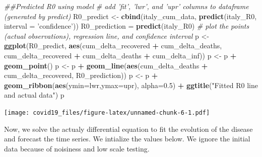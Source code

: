 \documentclass[]{article}
\newenvironment{Shaded}{\begin{snugshade}}{\end{snugshade}}
\newcommand{\CommentTok}[1]{\textcolor[rgb]{0.56,0.35,0.01}{\textit{#1}}}
\newcommand{\DataTypeTok}[1]{\textcolor[rgb]{0.13,0.29,0.53}{#1}}
\newcommand{\FloatTok}[1]{\textcolor[rgb]{0.00,0.00,0.81}{#1}}
\newcommand{\KeywordTok}[1]{\textcolor[rgb]{0.13,0.29,0.53}{\textbf{#1}}}
\newcommand{\NormalTok}[1]{#1}
\newcommand{\OperatorTok}[1]{\textcolor[rgb]{0.81,0.36,0.00}{\textbf{#1}}}
\newcommand{\StringTok}[1]{\textcolor[rgb]{0.31,0.60,0.02}{#1}}
\begin{document}
\begin{Shaded}
\begin{Highlighting}[]
\CommentTok{##Predicted R0 using model}
\CommentTok{# add 'fit', 'lwr', and 'upr' columns to dataframe (generated by predict)}
\NormalTok{R0_predict <-}\StringTok{ }\KeywordTok{cbind}\NormalTok{(italy_cum_data, }\KeywordTok{predict}\NormalTok{(italy_R0, }\DataTypeTok{interval =} \StringTok{'confidence'}\NormalTok{))}
\NormalTok{R0_prediction =}\StringTok{ }\KeywordTok{predict}\NormalTok{(italy_R0)}
\CommentTok{# plot the points (actual observations), regression line, and confidence interval}
\NormalTok{p <-}\StringTok{ }\KeywordTok{ggplot}\NormalTok{(R0_predict, }\KeywordTok{aes}\NormalTok{(cum_delta_recovered }\OperatorTok{+}\StringTok{ }\NormalTok{cum_delta_deaths, cum_delta_recovered }\OperatorTok{+}\StringTok{ }\NormalTok{cum_delta_deaths }\OperatorTok{+}\StringTok{ }\NormalTok{cum_delta_inf))}
\NormalTok{p <-}\StringTok{ }\NormalTok{p }\OperatorTok{+}\StringTok{ }\KeywordTok{geom_point}\NormalTok{()}
\NormalTok{p <-}\StringTok{ }\NormalTok{p }\OperatorTok{+}\StringTok{ }\KeywordTok{geom_line}\NormalTok{(}\KeywordTok{aes}\NormalTok{(cum_delta_deaths }\OperatorTok{+}\StringTok{ }\NormalTok{cum_delta_recovered, R0_prediction))}
\NormalTok{p <-}\StringTok{ }\NormalTok{p }\OperatorTok{+}\StringTok{ }\KeywordTok{geom_ribbon}\NormalTok{(}\KeywordTok{aes}\NormalTok{(}\DataTypeTok{ymin=}\NormalTok{lwr,}\DataTypeTok{ymax=}\NormalTok{upr), }\DataTypeTok{alpha=}\FloatTok{0.5}\NormalTok{) }\OperatorTok{+}\StringTok{ }\KeywordTok{ggtitle}\NormalTok{(}\StringTok{"Fitted R0 line and  actual data"}\NormalTok{)}
\NormalTok{p}
\end{Highlighting}
\end{Shaded}

\texttt{[image: covid19\_files/figure-latex/unnamed-chunk-6-1.pdf]}

Now, we solve the actualy differential equation to fit the evolution of
the disease and forecast the time series. We intialize the values below.
We ignore the initial data because of noisiness and low scale testing.
\end{document}
